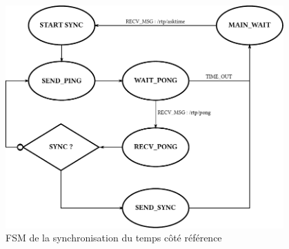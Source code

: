\begin{figure}[htbp]
  \centering
  \includegraphics[width=0.95\textwidth]{figs/fsm_time_ref.pdf}
  \caption{FSM de la synchronisation du temps côté référence}
  \label{fig:fsm_time_ref}
  \vspace{-17pt}
\end{figure}~\\

